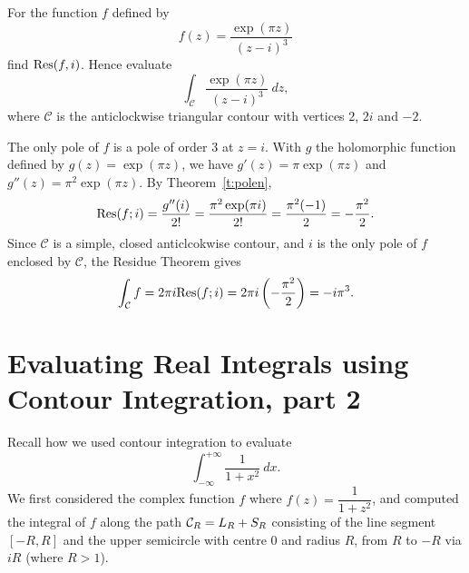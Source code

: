 \begin{example}
For the function $f$ defined by
\[
f(z) = \frac{\exp(\pi z)}{(z-i)^3}
\]
find $\mathrm{Res} (f,i)$.  Hence evaluate
\[
\int_{\mathcal{C}} \frac{\exp( \pi z)}{(z-i)^3}\ dz,
\]
where $\mathcal{C}$ is the anticlockwise triangular contour with vertices $2$, $2i$ and $-2$.
\end{example}
\begin{solution}
The only pole of $f$ is a pole of order $3$ at $z=i$.  With $g$ the holomorphic function defined by $g(z) = \exp(\pi z )$, we have $g'(z) = \pi \exp(\pi z)$ and $g''(z) = \pi^2 \exp(\pi z)$.  By Theorem~\ref{t:polen},
\[
\mathrm{Res}(f;i) = \frac{g''(i)}{2!} = \frac{\pi^2 \exp(\pi i)}{2!} = \frac{\pi^2(-1)}{2} = - \frac{\pi^2}{2}.
\]
Since $\mathcal{C}$ is a simple, closed anticlcokwise contour, and $i$ is the only pole of $f$ enclosed by $\mathcal{C}$, the Residue Theorem gives
\[
\int_{\mathcal{C}} f = 2\pi i \mathrm{Res} (f;i) = 2\pi i \left( -\frac{\pi^2}{2} \right) = -i \pi^3.
\]
\end{solution}

\section{Evaluating Real Integrals using Contour Integration, part 2}
Recall how we used contour integration to evaluate
\[
\int_{-\infty}^{+\infty} \frac{1}{1+x^2}\ dx.
\]
We first considered the complex function $f$ where $f(z)=\dfrac{1}{1+z^2}$, and computed the integral of $f$ along the path $\mathcal{C}_R = L_R+S_R$ consisting of the line segment $[-R,R]$ and the upper semicircle with centre $0$ and radius $R$, from $R$ to $-R$ via $iR$ (where $R>1$).

